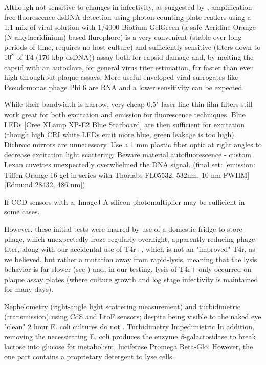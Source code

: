 \documentclass[paper.tex]{subfiles}
\begin{document}
Although not sensitive to changes in infectivity, as suggested by \cite{Quantification2020}, amplification-free fluorescence dsDNA detection using photon-counting plate readers using a 1:1 mix of viral solution with 1/4000 Biotium GelGreen (a safe Acridine Orange (N-alkylacridinium) based flurophore) is a very convenient (stable over long periods of time, requires no host culture) and sufficiently sensitive (titers down to $10^8$ of T4 (170 kbp dsDNA)) assay both for capsid damage and, by melting the capsid with an autoclave, for general virus titer estimation, far faster than even high-throughput plaque assays. More useful enveloped viral surrogates like Pseudomonas phage Phi 6 are RNA and a lower sensitivity can be expected. 

While their bandwidth is narrow, very cheap 0.5" laser line thin-film filters still work great for both excitation and emission for fluorescence techniques. Blue LEDs [Cree XLamp XP-E2 Blue Starboard] are then sufficient for excitation (though high CRI white LEDs emit more blue, green leakage is too high). Dichroic mirrors are unnecessary. Use a 1 mm plastic fiber optic at right angles to decrease excitation light scattering. Beware material autofluorescence - custom Lexan cuvettes unexpectedly overwhelmed the DNA signal. (final set: [emission: Tiffen Orange 16 gel in series with Thorlabs FL05532, 532nm, 10 nm FWHM] [Edmund 28432, 486 nm])

If CCD sensors with a, ImageJ \cite{Image2012} A silicon photomultiplier may be sufficient in some cases.

However, these initial tests were marred by use of a domestic fridge to store phage, which unexpectedly froze regularly overnight, apparently reducing phage titer, along with our accidental use of T4r+, which is not an "improved" T4r, as we believed, but rather a mutation away from rapid-lysis, meaning that the lysis behavior is far slower (see \cite{Spontaneous1946}) and, in our testing, lysis of T4r+ only occurred on plaque assay plates (where culture growth and log stage infectivity is maintained for many days). 

Nephelometry (right-angle light scattering measurement) and turbidimetric (transmission) using CdS and LtoF sensors; despite being visible to the naked eye "clean" 2 hour E. coli cultures do not .  Turbidimetry Impedimietric In addition, removing the necessitating 
E. coli produces the enzyme $\beta$-galactosidase to break lactose into glucose for metabolism. luciferase Promega Beta-Glo\cite{rapid2014}. However, the one part contains a proprietary detergent to lyse cells.
 
\end{document}
